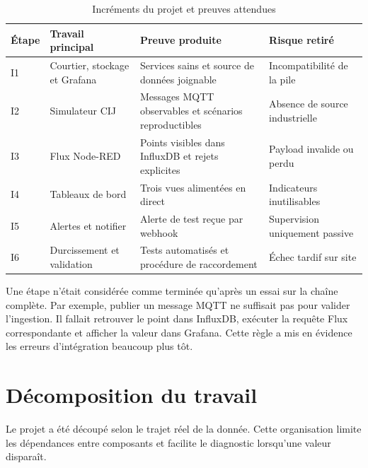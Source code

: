 \begin{table}[H]
\centering
\caption{Incréments du projet et preuves attendues}
\begin{tabularx}{\textwidth}{p{}p{}YY}
\toprule
Étape & Travail principal & Preuve produite & Risque retiré \\
\midrule
I1 & Courtier, stockage et Grafana & Services sains et source de données joignable &
Incompatibilité de la pile \\
I2 & Simulateur CIJ & Messages MQTT observables et scénarios reproductibles &
Absence de source industrielle \\
I3 & Flux Node-RED & Points visibles dans InfluxDB et rejets explicites &
Payload invalide ou perdu \\
I4 & Tableaux de bord & Trois vues alimentées en direct &
Indicateurs inutilisables \\
I5 & Alertes et notifier & Alerte de test reçue par webhook &
Supervision uniquement passive \\
I6 & Durcissement et validation & Tests automatisés et procédure de raccordement &
Échec tardif sur site \\
\bottomrule
\end{tabularx}
\end{table}

Une étape n'était considérée comme terminée qu'après un essai sur la
chaîne complète. Par exemple, publier un message MQTT ne suffisait pas pour
valider l'ingestion. Il fallait retrouver le point dans InfluxDB, exécuter la
requête Flux correspondante et afficher la valeur dans Grafana. Cette règle a
mis en évidence les erreurs d'intégration beaucoup plus tôt.

\section{Décomposition du travail}

Le projet a été découpé selon le trajet réel de la donnée. Cette organisation
limite les dépendances entre composants et facilite le diagnostic lorsqu'une
valeur disparaît.


